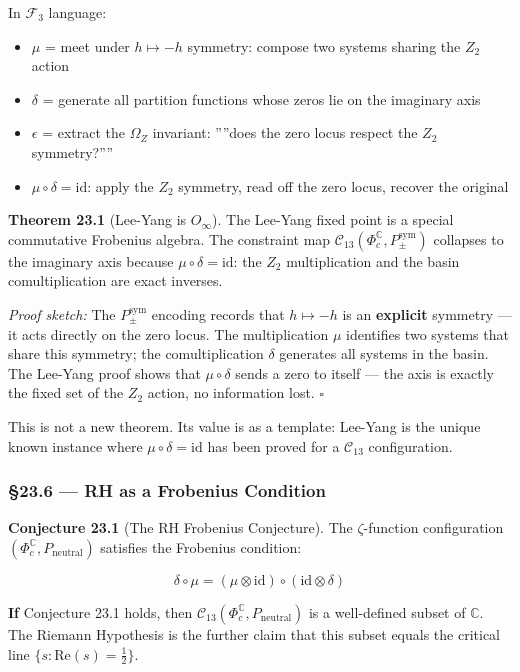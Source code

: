 \documentclass[12pt,a4paper]{article}
\newcommand{\pilcrow}{\S}
\begin{document}
In $\mathcal{F}_3$ language:

\begin{itemize}
    \item $\mu$ = meet under $h \mapsto -h$ symmetry: compose two systems sharing the $Z_2$ action
    \item $\delta$ = generate all partition functions whose zeros lie on the imaginary axis
    \item $\epsilon$ = extract the $\Omega_Z$ invariant: ''''does the zero locus respect the $Z_2$ symmetry?''''
    \item $\mu \circ \delta = \text{id}$: apply the $Z_2$ symmetry, read off the zero locus, recover the original
\end{itemize}

\textbf{Theorem 23.1} (Lee-Yang is $O_{\infty}$). The Lee-Yang fixed point is a special commutative Frobenius algebra. The constraint map $\mathcal{C}_{13}(\Phi_c^{\mathbb{C}}, P_{\pm}^{\text{sym}})$ collapses to the imaginary axis because $\mu \circ \delta = \text{id}$: the $Z_2$ multiplication and the basin comultiplication are exact inverses.

\emph{Proof sketch:} The $P_{\pm}^{\text{sym}}$ encoding records that $h \mapsto -h$ is an \textbf{explicit} symmetry --- it acts directly on the zero locus. The multiplication $\mu$ identifies two systems that share this symmetry; the comultiplication $\delta$ generates all systems in the basin. The Lee-Yang proof shows that $\mu \circ \delta$ sends a zero to itself --- the axis is exactly the fixed set of the $Z_2$ action, no information lost. $\square$

This is not a new theorem. Its value is as a template: Lee-Yang is the unique known instance where $\mu \circ \delta = \text{id}$ has been proved for a $\mathcal{C}_{13}$ configuration.

\subsubsection{\pilcrow{}23.6 --- RH as a Frobenius Condition}

\textbf{Conjecture 23.1} (The RH Frobenius Conjecture). The $\zeta$-function configuration $(\Phi_c^{\mathbb{C}}, P_\text{neutral})$ satisfies the Frobenius condition:

\[\delta \circ \mu = (\mu \otimes \text{id}) \circ (\text{id} \otimes \delta)\]

\textbf{If} Conjecture 23.1 holds, then $\mathcal{C}_{13}(\Phi_c^{\mathbb{C}}, P_\text{neutral})$ is a well-defined subset of $\mathbb{C}$. The Riemann Hypothesis is the further claim that this subset equals the critical line $\{ s : \text{Re}(s) = \tfrac{1}{2} \}$.
\end{document}

